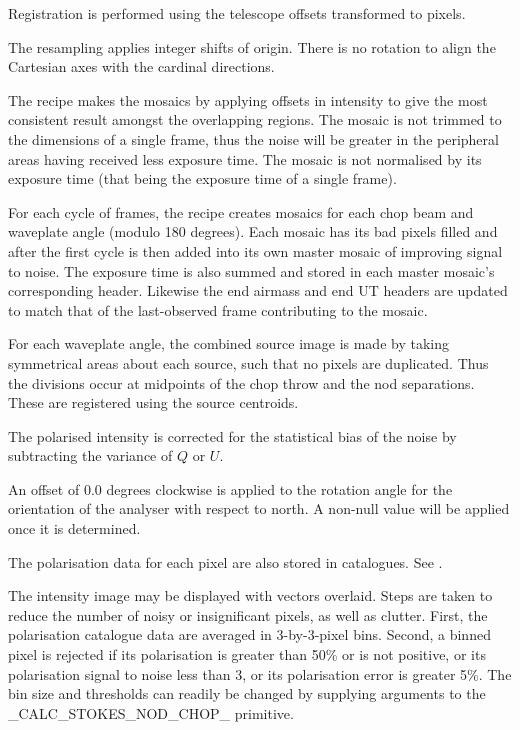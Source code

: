 \documentclass[twoside,11pt,nolof]{starlink}
\begin{document}
{{{         \sstitem
         Registration is performed using the telescope offsets
         transformed to pixels.

         \sstitem
         The resampling applies integer shifts of origin.   There is no
         rotation to align the Cartesian axes with the cardinal directions.

         \sstitem
         The recipe makes the mosaics by applying offsets in intensity
         to give the most consistent result amongst the overlapping regions.
         The mosaic is not trimmed to the dimensions of a single frame, thus
         the noise will be greater in the peripheral areas having received
         less exposure time.  The mosaic is not normalised by its exposure
         time (that being the exposure time of a single frame).

         \sstitem
         For each cycle of frames, the recipe creates mosaics for each
         chop beam and waveplate angle (modulo 180 degrees).  Each mosaic
         has its bad pixels filled and after the first cycle is then added
         into its own master mosaic of improving signal to noise.  The
         exposure time is also summed and stored in each master mosaic's
         corresponding header.  Likewise the end airmass and end UT headers
         are updated to match that of the last-observed frame contributing
         to the mosaic.

         \sstitem
         For each waveplate angle, the combined source image is made by
         taking symmetrical areas about each source, such that no pixels
         are duplicated.  Thus the divisions occur at midpoints of the chop
         throw and the nod separations.  These are registered using the
         source centroids.

         \sstitem
         The polarised intensity is corrected for the statistical bias
         of the noise by subtracting the variance of $Q$ or $U$.

         \sstitem
         An offset of 0.0 degrees clockwise is applied to the rotation
         angle for the orientation of the analyser with respect to north.
         A non-null value will be applied once it is determined.

         \sstitem
         The polarisation data for each pixel are also stored in
         catalogues.  See .

         \sstitem
         The intensity image may be displayed with vectors overlaid.
         Steps are taken to reduce the number of noisy or insignificant
         pixels, as well as clutter.  First, the polarisation catalogue data
         are averaged in 3-by-3-pixel bins.  Second, a binned pixel is
         rejected if its polarisation is greater than 50\% or is not positive,
         or its polarisation signal to noise less than 3, or its polarisation
         error is greater 5\%.  The bin size and thresholds can readily be
         changed by supplying arguments to the \_CALC\_STOKES\_NOD\_CHOP\_
         primitive.

}}}
\end{document}
